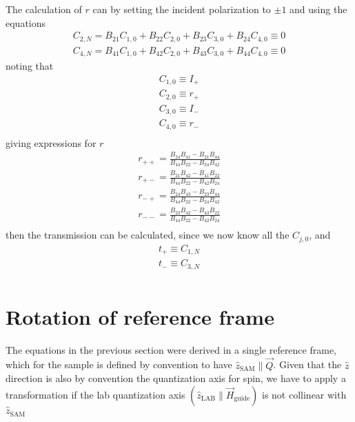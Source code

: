 \documentclass[%
 reprint,
 amsmath,
 amssymb,
 aps,
 prl,
 lengthcheck,%
]{revtex4-1}
\begin{document}
The calculation of $r$ can by setting 
the incident polarization to $\pm 1$ and using the equations
\begin{equation}
  \begin{array}{l}
    C_{2,N} = B_{21} C_{1,0} + B_{22} C_{2,0} + B_{23} C_{3,0} + B_{24} C_{4,0} \equiv 0\\
    C_{4,N} = B_{41} C_{1,0} + B_{42} C_{2,0} + B_{43} C_{3,0} + B_{44} C_{4,0} \equiv 0    
  \end{array}
\end{equation}
noting that
\begin{equation}
  \begin{array}{l}
    C_{1,0} \equiv I_+ \\
    C_{2,0} \equiv r_+ \\
    C_{3,0} \equiv I_- \\
    C_{4,0} \equiv r_- \\
  \end{array}
\end{equation}
giving expressions for $r$
\begin{equation}
  \begin{array}{l}
    r_{++} = \frac{B_{24}B_{41} - B_{21}B_{44}}{B_{44}B_{22} - B_{24}B_{42}}\\[0.3em]
    r_{+-} = \frac{B_{21}B_{42} - B_{41}B_{22}}{B_{44}B_{22} - B_{42}B_{24}}\\[0.3em]
    r_{-+} = \frac{B_{24}B_{43} - B_{23}B_{44}}{B_{44}B_{22} - B_{24}B_{42}}\\[0.3em]
    r_{--} = \frac{B_{23}B_{42} - B_{43}B_{22}}{B_{44}B_{22} - B_{42}B_{24}}\\[0.3em]
  \end{array}
\end{equation}
then the transmission can be calculated, since 
we now know all the $C_{j,0}$, and 
\begin{equation}
  \begin{array}{l}
    t_+ \equiv C_{1,N} \\
    t_- \equiv C_{3,N} \\
  \end{array}
\end{equation}


\section{Rotation of reference frame}

The equations in the previous section were derived in a single reference frame, 
which for the sample is defined by convention to have $\hat z_{\textrm{SAM}} \parallel \vec Q$.
Given that the $\hat z$ direction is also by convention the quantization axis 
for spin, we have to apply a transformation if the lab quantization axis 
$(\hat z_{\textrm {LAB}} \parallel \vec H_{\textrm{guide}})$ is not collinear with
$\hat z_{\textrm{SAM}}$
\end{document}
